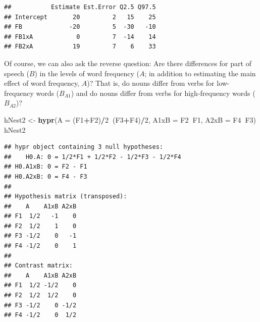 \documentclass[12pt,]{krantz}
\newenvironment{Shaded}{\begin{snugshade}}{\end{snugshade}}
\newcommand{\KeywordTok}[1]{\textcolor[rgb]{0.13,0.29,0.53}{\textbf{#1}}}
\newcommand{\DataTypeTok}[1]{\textcolor[rgb]{0.13,0.29,0.53}{#1}}
\newcommand{\DecValTok}[1]{\textcolor[rgb]{0.00,0.00,0.81}{#1}}
\newcommand{\StringTok}[1]{\textcolor[rgb]{0.31,0.60,0.02}{#1}}
\newcommand{\OperatorTok}[1]{\textcolor[rgb]{0.81,0.36,0.00}{\textbf{#1}}}
\newcommand{\NormalTok}[1]{#1}
\theoremstyle{definition}
\theoremstyle{definition}
\theoremstyle{definition}
\theoremstyle{remark}
\begin{document}
\begin{verbatim}
##           Estimate Est.Error Q2.5 Q97.5
## Intercept       20         2   15    25
## FB             -20         5  -30   -10
## FB1xA            0         7  -14    14
## FB2xA           19         7    6    33
\end{verbatim}

Of course, we can also ask the reverse question: Are there differences
for part of speech (\(B\)) in the levels of word frequency (\(A\); in
addition to estimating the main effect of word frequency, \(A\))? That
is, do nouns differ from verbs for low-frequency words (\(B_{A1}\)) and
do nouns differ from verbs for high-frequency words (\(B_{A2}\))?

\begin{Shaded}
\begin{Highlighting}[]
\NormalTok{hNest2 <-}\StringTok{ }\KeywordTok{hypr}\NormalTok{(}\DataTypeTok{A    =}\NormalTok{ (F1}\OperatorTok{+}\NormalTok{F2)}\OperatorTok{/}\DecValTok{2}\OperatorTok{~}\NormalTok{(F3}\OperatorTok{+}\NormalTok{F4)}\OperatorTok{/}\DecValTok{2}\NormalTok{,}
               \DataTypeTok{A1xB =}\NormalTok{ F2}\OperatorTok{~}\NormalTok{F1,}
               \DataTypeTok{A2xB =}\NormalTok{ F4}\OperatorTok{~}\NormalTok{F3)}
\NormalTok{hNest2}
\end{Highlighting}
\end{Shaded}

\begin{verbatim}
## hypr object containing 3 null hypotheses:
##    H0.A: 0 = 1/2*F1 + 1/2*F2 - 1/2*F3 - 1/2*F4
## H0.A1xB: 0 = F2 - F1
## H0.A2xB: 0 = F4 - F3
## 
## Hypothesis matrix (transposed):
##    A    A1xB A2xB
## F1  1/2   -1    0
## F2  1/2    1    0
## F3 -1/2    0   -1
## F4 -1/2    0    1
## 
## Contrast matrix:
##    A    A1xB A2xB
## F1  1/2 -1/2    0
## F2  1/2  1/2    0
## F3 -1/2    0 -1/2
## F4 -1/2    0  1/2
\end{verbatim}
\end{document}
